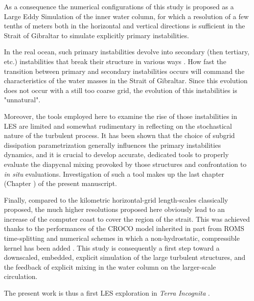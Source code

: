 As a consequence the numerical configurations of this study is proposed as a Large Eddy Simulation of the inner water column, for which a resolution of a few tenths of meters both in the horizontal and vertical directions is sufficient in the Strait of Gibraltar to simulate explicitly primary instabilities.

In the real ocean, such primary instabilities devolve into secondary (then tertiary, etc.) instabilities that break their structure in various ways \citep{mashayek_2012}. How fast the transition between primary and secondary instabilities occurs will command the characteristics of the water masses in the Strait of Gibraltar. Since this evolution does not occur with a still too coarse grid, the evolution of this instabilities is "unnatural".

Moreover, the tools employed here to examine the rise of those instabilities in LES are limited and somewhat rudimentary in reflecting on the stochastical nature of the turbulent process. It has been shown that the choice of subgrid dissipation parametrization generally influences the primary instabilities dynamics, and it is crucial to develop accurate, dedicated tools to properly evaluate the diapycnal mixing provoked by those structures and confrontation to \textit{in situ} evaluations. Investigation of such a tool makes up the last chapter (Chapter ) of the present manuscript.

Finally, compared to the kilometric horizontal-grid length-scales classically proposed, the much higher resolutions proposed here obviously lead to an increase of the computer coast to cover the region of the strait. This was achieved thanks to the performances of the CROCO model inherited in part from ROMS time-splitting and numerical schemes \citep{shchepetkin_regional_2005} in which a non-hydrostatic, compressible kernel has been added \citep{Auclair2018, hilt_2020}. This study is consequently a first step toward a downscaled, embedded, explicit simulation of the large turbulent structures, and the feedback of explicit mixing in the water column on the larger-scale circulation.

The present work is thus a first LES exploration in \textit{Terra Incognita} \citep{scotti_large_2010, wyngaard_toward_2004}.